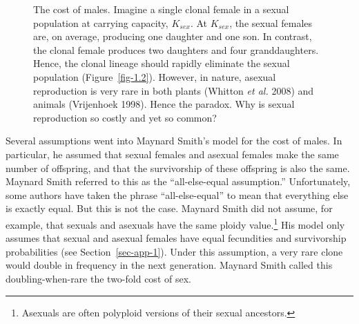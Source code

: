 \documentclass[
  letterpaper,
]{book}
\begin{document}
\begin{figure}


\caption[The cost of males]{\label{fig-1.1}The cost of males. Imagine a
single clonal female in a sexual population at carrying capacity,
\(K_{sex}\). At \(K_{sex}\), the sexual females are, on average,
producing one daughter and one son. In contrast, the clonal female
produces two daughters and four granddaughters. Hence, the clonal
lineage should rapidly eliminate the sexual population
(Figure~\ref{fig-1.2}). However, in nature, asexual reproduction is very
rare in both plants (Whitton \emph{et al.} 2008) and animals (Vrijenhoek
1998). Hence the paradox. Why is sexual reproduction so costly and yet
so common?}

\end{figure}%

Several assumptions went into Maynard Smith's model for the cost of
males. In particular, he assumed that sexual females and asexual females
make the same number of offspring, and that the survivorship of these
offspring is also the same. Maynard Smith referred to this as the
``all-else-equal assumption.'' Unfortunately, some authors have taken
the phrase ``all-else-equal'' to mean that everything else is exactly
equal. But this is not the case. Maynard Smith did not assume, for
example, that sexuals and asexuals have the same ploidy
value.\footnote{Asexuals are often polyploid versions of their sexual
  ancestors.} His model only assumes that sexual and asexual females
have equal fecundities and survivorship probabilities (see
Section~\ref{sec-app-1}). Under this assumption, a very rare clone would
double in frequency in the next generation. Maynard Smith called this
doubling-when-rare the two-fold cost of sex.
\end{document}
